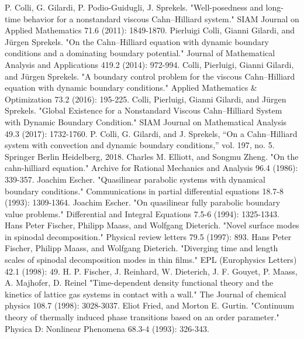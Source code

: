 \documentclass[a4paper]{jsarticle}
\begin{document}
\begin{thebibliography}{99}
		P. Colli, G. Gilardi, P. Podio-Guidugli, J. Sprekels. "Well-posedness and long-time behavior for a nonstandard viscous Cahn–Hilliard system." SIAM Journal on Applied Mathematics 71.6 (2011): 1849-1870.
		Pierluigi Colli, Gianni Gilardi, and Jürgen Sprekels. "On the Cahn–Hilliard equation with dynamic boundary conditions and a dominating boundary potential." Journal of Mathematical Analysis and Applications 419.2 (2014): 972-994.
		Colli, Pierluigi, Gianni Gilardi, and Jürgen Sprekels. "A boundary control problem for the viscous Cahn–Hilliard equation with dynamic boundary conditions." Applied Mathematics \& Optimization 73.2 (2016): 195-225.
		Colli, Pierluigi, Gianni Gilardi, and Jürgen Sprekels. "Global Existence for a Nonstandard Viscous Cahn--Hilliard System with Dynamic Boundary Condition." SIAM Journal on Mathematical Analysis 49.3 (2017): 1732-1760.
		P. Colli, G. Gilardi, and J. Sprekels, “On a Cahn--Hilliard system with convection and dynamic boundary conditions,” vol. 197, no. 5. Springer Berlin Heidelberg, 2018.
		Charles M. Elliott, and Songmu Zheng. "On the cahn-hilliard equation." Archive for Rational Mechanics and Analysis 96.4 (1986): 339-357.
		Joachim Escher. "Quasilinear parabolic systems with dynamical boundary conditions." Communications in partial differential equations 18.7-8 (1993): 1309-1364.
		Joachim Escher. "On quasilinear fully parabolic boundary value problems." Differential and Integral Equations 7.5-6 (1994): 1325-1343.
		Hans Peter Fischer, Philipp Maass, and Wolfgang Dieterich. "Novel surface modes in spinodal decomposition." Physical review letters 79.5 (1997): 893.
		Hans Peter Fischer, Philipp Maass, and Wolfgang Dieterich. "Diverging time and length scales of spinodal decomposition modes in thin films." EPL (Europhysics Letters) 42.1 (1998): 49.
		H. P. Fischer, J. Reinhard, W. Dieterich, J. F. Gouyet, P. Maass, A. Majhofer, D. Reinel "Time-dependent density functional theory and the kinetics of lattice gas systems in contact with a wall." The Journal of chemical physics 108.7 (1998): 3028-3037.
		Eliot Fried, and Morton E. Gurtin. "Continuum theory of thermally induced phase transitions based on an order parameter." Physica D: Nonlinear Phenomena 68.3-4 (1993): 326-343.

\end{thebibliography}
\end{document}
